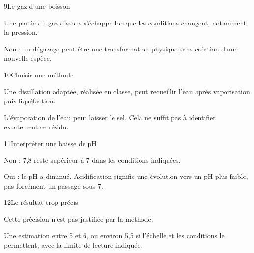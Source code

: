 \par\noindent\begin{minipage}{\linewidth}
\begin{corrige}{9}{Le gaz d’une boisson}
\begin{questions}
\item Une partie du gaz dissous s’échappe lorsque les conditions changent, notamment la pression.
\item Non : un dégazage peut être une transformation physique sans création d’une nouvelle espèce.
\end{questions}
\end{corrige}
\end{minipage}
\par\noindent\begin{minipage}{\linewidth}
\begin{corrige}{10}{Choisir une méthode}
\begin{questions}
\item Une distillation adaptée, réalisée en classe, peut recueillir l’eau après vaporisation puis liquéfaction.
\item L’évaporation de l’eau peut laisser le sel. Cela ne suffit pas à identifier exactement ce résidu.
\end{questions}
\end{corrige}
\end{minipage}
\par\noindent\begin{minipage}{\linewidth}
\begin{corrige}{11}{Interpréter une baisse de pH}
\begin{questions}
\item Non : 7,8 reste supérieur à 7 dans les conditions indiquées.
\item Oui : le pH a diminué. Acidification signifie une évolution vers un pH plus faible, pas forcément un passage sous 7.
\end{questions}
\end{corrige}
\end{minipage}
\par\noindent\begin{minipage}{\linewidth}
\begin{corrige}{12}{Le résultat trop précis}
\begin{questions}
\item Cette précision n’est pas justifiée par la méthode.
\item Une estimation entre 5 et 6, ou environ 5,5 si l’échelle et les conditions le permettent, avec la limite de lecture indiquée.
\end{questions}
\end{corrige}
\end{minipage}
